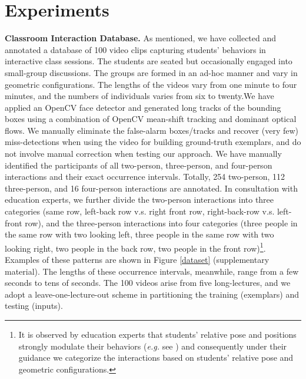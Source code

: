 \section{Experiments}
\label{expall}


\noindent\textbf{Classroom Interaction Database.} As mentioned, we have collected and annotated a database of 100 video clips capturing students' behaviors in interactive class sessions. The students are seated but occasionally engaged into small-group discussions. The groups are formed in an ad-hoc manner and vary in geometric configurations. The lengths of the videos vary from one minute to four minutes, and the numbers of individuals varies from six to twenty.We have applied an OpenCV face detector and generated long tracks of the bounding boxes using a combination of OpenCV mean-shift tracking and dominant optical flows. We manually eliminate the false-alarm boxes/tracks and recover (very few) miss-detections when using the video for building ground-truth exemplars, and do not involve manual correction when testing our approach. We have manually identified the participants of all two-person, three-person, and four-person interactions and their exact occurrence intervals. Totally, 254 two-person, 112 three-person, and 16 four-person interactions are annotated. In consultation with education experts, we further divide the two-person interactions into three categories (same row, left-back row v.s. right front row, right-back-row v.s. left-front row), and the three-person interactions into four categories (three people in the same row with two looking left, three people in the same row with two looking right, two people in the back row, two people in the front row)\footnote{It is observed by education experts that students' relative pose and positions strongly modulate their behaviors (\textit{e.g.} see \cite{Crouch:PI}) and consequently under their guidance we categorize the interactions based on students' relative pose and geometric configurations.}. Examples of these patterns are shown in Figure \ref{dataset} (supplementary material). The lengths of these occurrence intervals, meanwhile, range from a few seconds to tens of seconds. The 100 videos arise from five long-lectures, and we adopt a leave-one-lecture-out scheme in partitioning the training (exemplars) and testing (inputs). 

